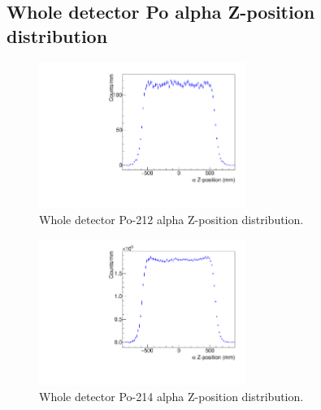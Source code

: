 \subsection{Whole detector Po alpha Z-position distribution}
\begin{figure}[!h]
\centering
\includegraphics[width=0.6\textwidth]{figures/PubBiPo212Zdistribution.pdf}
\caption{\label{fig:Z212}Whole detector Po-212 alpha Z-position distribution.}
\end{figure}
\begin{figure}[!h]
\centering
\includegraphics[width=0.6\textwidth]{figures/PubBiPo214Zdistribution.pdf}
\caption{\label{fig:Z214}Whole detector Po-214 alpha Z-position distribution.}
\end{figure}
\newpage
